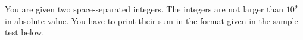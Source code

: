 

You are given two space-separated integers.
The integers are not larger than $10^9$ in absolute value.
You have to print their sum in the format given in the sample test below.

